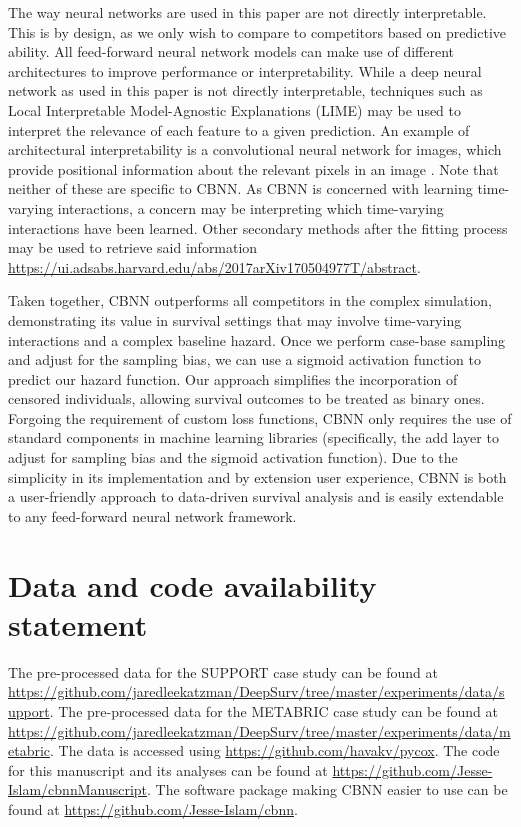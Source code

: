 \documentclass[AMA,STIX1COL,]{WileyNJD-v2}
\begin{document}
The way neural networks are used in this paper are not directly
interpretable. This is by design, as we only wish to compare to
competitors based on predictive ability. All feed-forward neural network
models can make use of different architectures to improve performance or
interpretability. While a deep neural network as used in this paper is
not directly interpretable, techniques such as Local Interpretable
Model-Agnostic Explanations (LIME) \citep{ribeiro2016model} may be used
to interpret the relevance of each feature to a given prediction. An
example of architectural interpretability is a convolutional neural
network for images, which provide positional information about the
relevant pixels in an image \citep{keras}. Note that neither of these
are specific to CBNN. As CBNN is concerned with learning time-varying
interactions, a concern may be interpreting which time-varying
interactions have been learned. Other secondary methods after the
fitting process may be used to retrieve said information
\url{https://ui.adsabs.harvard.edu/abs/2017arXiv170504977T/abstract}.

Taken together, CBNN outperforms all competitors in the complex
simulation, demonstrating its value in survival settings that may
involve time-varying interactions and a complex baseline hazard. Once we
perform case-base sampling and adjust for the sampling bias, we can use
a sigmoid activation function to predict our hazard function. Our
approach simplifies the incorporation of censored individuals, allowing
survival outcomes to be treated as binary ones. Forgoing the requirement
of custom loss functions, CBNN only requires the use of standard
components in machine learning libraries (specifically, the add layer to
adjust for sampling bias and the sigmoid activation function). Due to
the simplicity in its implementation and by extension user experience,
CBNN is both a user-friendly approach to data-driven survival analysis
and is easily extendable to any feed-forward neural network framework.

\hypertarget{data-and-code-availability-statement}{%
\section*{Data and code availability
statement}\label{data-and-code-availability-statement}}

The pre-processed data for the SUPPORT case study can be found at
\url{https://github.com/jaredleekatzman/DeepSurv/tree/master/experiments/data/support}.
The pre-processed data for the METABRIC case study can be found at
\url{https://github.com/jaredleekatzman/DeepSurv/tree/master/experiments/data/metabric}.
The data is accessed using \url{https://github.com/havakv/pycox}. The
code for this manuscript and its analyses can be found at
\url{https://github.com/Jesse-Islam/cbnnManuscript}. The software
package making CBNN easier to use can be found at
\url{https://github.com/Jesse-Islam/cbnn}.
\end{document}
